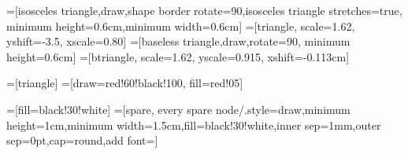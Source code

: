 =[isosceles triangle,draw,shape border rotate=90,isosceles triangle stretches=true, minimum height=0.6cm,minimum width=0.6cm]
=[triangle, scale=1.62, yshift=-3.5, xscale=0.80]
=[baseless triangle,draw,rotate=90, minimum height=0.6cm]
=[btriangle, scale=1.62, yscale=0.915, xshift=-0.113cm]

=[triangle]
=[draw=red!60!black!100, fill=red!05]

=[fill=black!30!white]
=[spare, every spare node/.style={draw,minimum height=1cm,minimum width=1.5cm,fill=black!30!white,inner sep=1mm,outer sep=0pt,cap=round,add font=\sffamily}]
